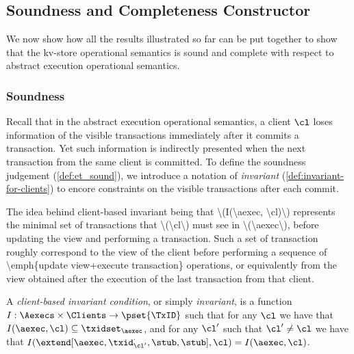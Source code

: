 \subsection{Soundness and Completeness Constructor}
\label{sec:kv2aexec-sound-complete}

We now show how all the results illustrated so far 
can be put together to show that the kv-store operational semantics 
is sound and complete with respect to abstract execution operational semantics.

\subsubsection{Soundness}
Recall that in the abstract execution operational semantics,
a client \( \cl \) loses information of the visible transactions immediately after it commits a transaction.
Yet such information is indirectly presented when the next transaction from the same client is committed.
To define the soundness judgement (\cref{def:et_sound}), we introduce a notation of \emph{invariant} (\cref{def:invariant-for-clients})
to encore constraints on the visible transactions after each commit.

\ac{The idea behind client-based invariant being that \(I(\aexec, \cl)\) represents 
the minimal set of transactions that \(\cl\) must see in \(\aexec\), before 
updating the view and performing a transaction. Such a set of transaction 
roughly correspond to the view of the client before performing a 
sequence of \emph{update view+execute transaction} operations, 
or equivalently from the view obtained after the execution of the 
last transaction from that client.}

\begin{definition}
\label{def:invariant-for-clients}
A \emph{client-based invariant condition}, or simply \emph{invariant}, is a 
function \(I : \Aexecs \times \Clients \to \pset{\TxID}\) 
such that for any \(\cl\) we have that \(I(\aexec, \cl) \subseteq \txidset_{\aexec}\), and 
for any  \(\cl'\) such that \(\cl' \neq \cl\) we have that 
\(I(\extend[\aexec, \txid_{\cl'}^{\cdot}, \stub, \stub], \cl) = I(\aexec, \cl)\).
\end{definition}



